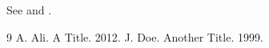 \documentclass{article}
\begin{document}
See \cite{a} and \cite{b}.
\begin{thebibliography}{9}
 A. Ali. A Title. 2012.
 J. Doe. Another Title. 1999.
\end{thebibliography}
\end{document}
